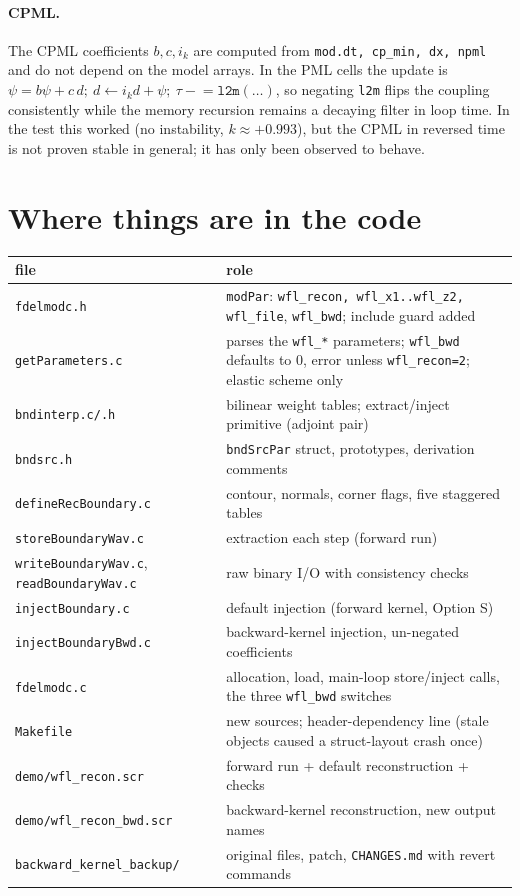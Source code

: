 \documentclass[11pt,a4paper]{article}
\begin{document}
\paragraph{CPML.}
The CPML coefficients $b,c,i_k$ are computed from
\texttt{mod.dt, cp\_min, dx, npml} and do not depend on the model arrays. In the
PML cells the update is $\psi=b\psi+c\,d;\ d\leftarrow i_kd+\psi;\ \tau\mathrel{-}=\texttt{l2m}(\dots)$,
so negating \texttt{l2m} flips the coupling consistently while the memory
recursion remains a decaying filter in loop time. In the test this worked (no
instability, $k\approx+0.993$), but the CPML in reversed time is not proven
stable in general; it has only been observed to behave.

\section{Where things are in the code}
\begin{center}\small
\begin{tabular}{p{4.1cm}p{10.3cm}}\toprule
file & role\\\midrule
\texttt{fdelmodc.h} & \texttt{modPar}: \texttt{wfl\_recon, wfl\_x1..wfl\_z2, wfl\_file}, \texttt{wfl\_bwd}; include guard added\\
\texttt{getParameters.c} & parses the \texttt{wfl\_*} parameters; \texttt{wfl\_bwd} defaults to 0, error unless \texttt{wfl\_recon=2}; elastic scheme only\\
\texttt{bndinterp.c/.h} & bilinear weight tables; extract/inject primitive (adjoint pair)\\
\texttt{bndsrc.h} & \texttt{bndSrcPar} struct, prototypes, derivation comments\\
\texttt{defineRecBoundary.c} & contour, normals, corner flags, five staggered tables\\
\texttt{storeBoundaryWav.c} & extraction each step (forward run)\\
\texttt{writeBoundaryWav.c}, \texttt{readBoundaryWav.c} & raw binary I/O with consistency checks\\
\texttt{injectBoundary.c} & default injection (forward kernel, Option S)\\
\texttt{injectBoundaryBwd.c} & backward-kernel injection, un-negated coefficients\\
\texttt{fdelmodc.c} & allocation, load, main-loop store/inject calls, the three \texttt{wfl\_bwd} switches\\
\texttt{Makefile} & new sources; header-dependency line (stale objects caused a struct-layout crash once)\\
\texttt{demo/wfl\_recon.scr} & forward run + default reconstruction + checks\\
\texttt{demo/wfl\_recon\_bwd.scr} & backward-kernel reconstruction, new output names\\
\texttt{backward\_kernel\_backup/} & original files, patch, \texttt{CHANGES.md} with revert commands\\\bottomrule
\end{tabular}
\end{center}
\end{document}
